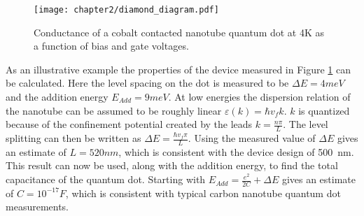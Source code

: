 \begin{figure}
    \centering
    \texttt{[image: chapter2/diamond\_diagram.pdf]}
    \caption{Conductance of a cobalt contacted nanotube quantum dot at 4K as a function of bias and gate voltages.}
    \label{fig:coulomb_diamonds}
\end{figure}

As an illustrative example the properties of the device measured in Figure \ref{fig:coulomb_diamonds} can be calculated. Here the level spacing on the dot is measured to be $\Delta E = 4meV$ and the addition energy $E_{Add} = 9meV$. At low energies the dispersion relation of the nanotube can be assumed to be roughly linear $\varepsilon(k) = \hbar v_f k$. $k$ is quantized because of the confinement potential created by the leads $k = \frac{n\pi}{L}$. The level splitting can then be written as $\Delta E = \frac{\hbar v_f \pi}{L}$. Using the measured value of $\Delta E$ gives an estimate of $L = 520nm$, which is consistent with the device design of \SI{500}{\nano\meter}. This result can now be used, along with the addition energy, to find the total capacitance of the quantum dot. Starting with $E_{Add} = \frac{e^2}{2C} + \Delta E$ gives an estimate of $C=10^{-17}F$, which is consistent with typical carbon nanotube quantum dot measurements.